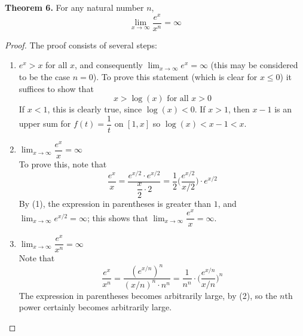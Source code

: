 \documentclass[10pt,letterpaper]{article}
\begin{document}
	\textbf{Theorem 6. } For any natural number $n$,
	$$\displaystyle\lim_{x\to \infty} \dfrac{e^x}{x^n} = \infty$$
\begin{proof}
	The proof consists of several steps:
	\begin{enumerate}[(1)]
	\item $e^x > x$ for all $x$, and consequently $\displaystyle\lim_{x\to \infty}e^x = \infty$ (this
	may be considered to be the case $n = 0$).
	To prove this statement (which is clear for $x \leq 0$) it suffices to show that
	$$x > \log(x) \text{ for all } x > 0$$
	If $x < 1$, this is clearly true, since $\log(x) < 0$. If $x > 1$, then $x - 1$ is an 
	upper sum for $f(t) = \dfrac{1}{t}$ on $[1, x]$ so $\log(x) < x - 1 < x$.
	\item $\displaystyle\lim_{x\to \infty} \dfrac{e^x}{x} = \infty$ \\
	To prove this, note that
	$$\dfrac{e^x}{x} = \dfrac{e^{x/2} \cdot e^{x/2}}{\dfrac{x}{2} \cdot 2}
	= \dfrac{1}{2} \bigg( \dfrac{e^{x/2}}{x/2} \bigg) \cdot e^{x/2}$$
	By (1), the expression in parentheses is greater than $1$, and 
	$\displaystyle\lim_{x\to \infty} e^{x/2} = \infty$; this shows that
	$\displaystyle\lim_{x\to \infty} \dfrac{e^x}{x} = \infty$.
	
	\item $\displaystyle\lim_{x\to \infty} \dfrac{e^x}{x^n} = \infty$ \\
	Note that
	$$\dfrac{e^x}{x^n} = \dfrac{(e^{x/n})^n}{(x/n)^n \cdot n^n} 
	= \dfrac{1}{n^n} \cdot \bigg( \dfrac{e^{x/n}}{x/n} \bigg)^n$$
	The expression in parentheses becomes arbitrarily large, by (2), so the $n$th
	power certainly becomes arbitrarily large.	
	
	
	\end{enumerate}
		
	
	
\end{proof}	
	

	
\end{document}
